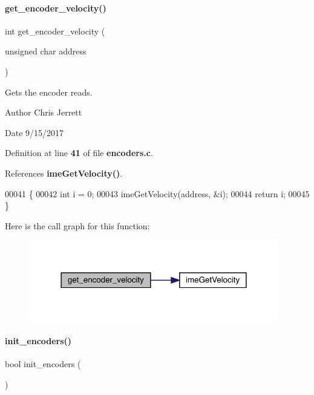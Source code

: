 \paragraph{get\+\_\+encoder\+\_\+velocity()}
{\footnotesize\ttfamily int get\+\_\+encoder\+\_\+velocity (\begin{DoxyParamCaption}\item[{unsigned char}]{address }\end{DoxyParamCaption})}



Gets the encoder reads. 

\begin{DoxyAuthor}{Author}
Chris Jerrett 
\end{DoxyAuthor}
\begin{DoxyDate}{Date}
9/15/2017 
\end{DoxyDate}


Definition at line \textbf{ 41} of file \textbf{ encoders.\+c}.



References \textbf{ ime\+Get\+Velocity()}.


\begin{DoxyCode}
00041                                                 \{
00042   \textcolor{keywordtype}{int} i = 0;
00043   imeGetVelocity(address, &i);
00044   \textcolor{keywordflow}{return} i;
00045 \}
\end{DoxyCode}
Here is the call graph for this function\+:
\nopagebreak
\begin{figure}[H]
\begin{center}
\leavevmode
\includegraphics[width=309pt]{encoders_8c_a8e6b77703c5cf18e00709b052fb4bf22_cgraph}
\end{center}
\end{figure}
\mbox{\label{encoders_8c_aa6ec1ca17e907babd52803ecba451cd3}} 
\paragraph{init\+\_\+encoders()}
{\footnotesize\ttfamily bool init\+\_\+encoders (\begin{DoxyParamCaption}{ }\end{DoxyParamCaption})}



